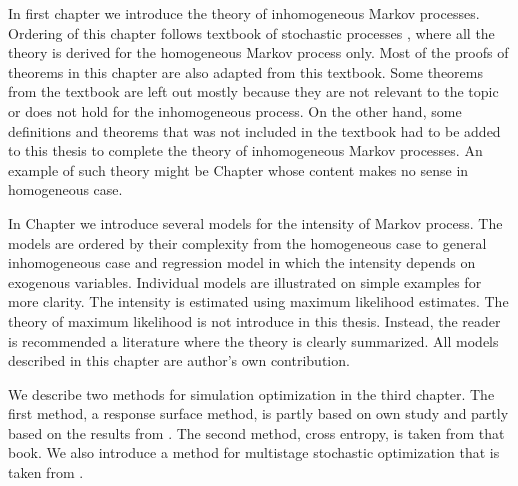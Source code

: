 In first chapter we introduce the theory of inhomogeneous Markov processes. Ordering of this chapter follows textbook of stochastic processes \cite{PraskovaLachout12}, where all the theory is derived for the homogeneous Markov process only. Most of the proofs of theorems in this chapter are also adapted from this textbook. Some theorems from the textbook are left out mostly because they are not relevant to the topic or does not hold for the inhomogeneous process. On the other hand, some definitions and theorems that was not included in the textbook had to be added to this thesis to complete the theory of inhomogeneous Markov processes. An example of such theory might be Chapter  whose content makes no sense in homogeneous case.

In Chapter  we introduce several models for the intensity of Markov process. The models are ordered by their complexity from the homogeneous case to general inhomogeneous case and regression model in which the intensity depends on exogenous variables. Individual models are illustrated on simple examples for more clarity. The intensity is estimated using maximum likelihood estimates. The theory of maximum likelihood is not introduce in this thesis. Instead, the reader is recommended a literature where the theory is clearly summarized. All models described in this chapter are author's own contribution.

We describe two methods for simulation optimization in the third chapter. The first method, a response surface method, is partly based on own study and partly based on the results from \cite{Kroese11}. The second method, cross entropy, is taken from that book. We also introduce a method for multistage stochastic optimization that is taken from \cite{Pflug14}.
